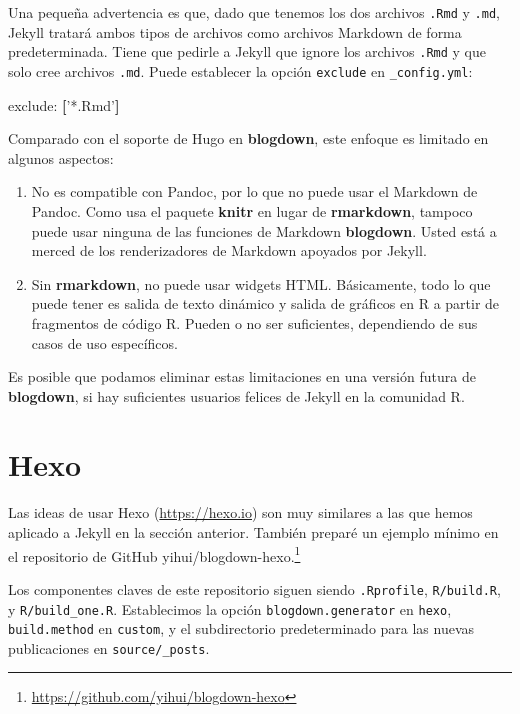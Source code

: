 \documentclass[12pt,]{krantz}
\makeatletter
\newenvironment{Shaded}{\begin{snugshade}}{\end{snugshade}}
\newcommand{\AttributeTok}[1]{\textcolor[rgb]{0.77,0.63,0.00}{#1}}
\newcommand{\FunctionTok}[1]{\textcolor[rgb]{0.00,0.00,0.00}{#1}}
\newcommand{\KeywordTok}[1]{\textcolor[rgb]{0.13,0.29,0.53}{\textbf{#1}}}
\newcommand{\StringTok}[1]{\textcolor[rgb]{0.31,0.60,0.02}{#1}}
\renewcommand{\href}[2]{#2\footnote{\url{#1}}}
\newenvironment{kframe}{%
\medskip{}
\setlength{\fboxsep}{.8em}
 \def\at@end@of@kframe{}%
 \ifinner\ifhmode%
  \def\at@end@of@kframe{\end{minipage}}%
  \begin{minipage}{\columnwidth}%
 \fi\fi%
 \def\FrameCommand##1{\hskip\@totalleftmargin \hskip-\fboxsep
 \colorbox{shadecolor}{##1}\hskip-\fboxsep
     \hskip-\linewidth \hskip-\@totalleftmargin \hskip\columnwidth}%
 \MakeFramed {\advance\hsize-\width
   \@totalleftmargin\z@ \linewidth\hsize
   \@setminipage}}%
 {\par\unskip\endMakeFramed%
 \at@end@of@kframe}
\renewenvironment{Shaded}{\begin{kframe}}{\end{kframe}}
\theoremstyle{definition}
\theoremstyle{definition}
\theoremstyle{definition}
\theoremstyle{remark}
\makeatother
\begin{document}
Una pequeña advertencia es que, dado que tenemos los dos archivos
\texttt{.Rmd} y \texttt{.md}, Jekyll tratará ambos tipos de archivos
como archivos Markdown de forma predeterminada. Tiene que pedirle a
Jekyll que ignore los archivos \texttt{.Rmd} y que solo cree archivos
\texttt{.md}. Puede establecer la opción \texttt{exclude} en
\texttt{\_config.yml}:

\begin{Shaded}
\begin{Highlighting}[]
\FunctionTok{exclude:}\AttributeTok{ }\KeywordTok{[}\StringTok{'*.Rmd'}\KeywordTok{]}
\end{Highlighting}
\end{Shaded}

Comparado con el soporte de Hugo en \textbf{blogdown}, este enfoque es
limitado en algunos aspectos:

\begin{enumerate}
\def\labelenumi{\arabic{enumi}.}
\item
  No es compatible con Pandoc, por lo que no puede usar el Markdown de
  Pandoc. Como usa el paquete \textbf{knitr} en lugar de
  \textbf{rmarkdown}, tampoco puede usar ninguna de las funciones de
  Markdown \textbf{blogdown}. Usted está a merced de los renderizadores
  de Markdown apoyados por Jekyll.
\item
  Sin \textbf{rmarkdown}, no puede usar widgets HTML. Básicamente, todo
  lo que puede tener es salida de texto dinámico y salida de gráficos en
  R a partir de fragmentos de código R. Pueden o no ser suficientes,
  dependiendo de sus casos de uso específicos.
\end{enumerate}

Es posible que podamos eliminar estas limitaciones en una versión futura
de \textbf{blogdown}, si hay suficientes usuarios felices de Jekyll en
la comunidad R.

\hypertarget{hexo}{%
\section{Hexo}\label{hexo}}

Las ideas de usar Hexo (\url{https://hexo.io}) son muy
similares a las que hemos aplicado a Jekyll en la sección anterior.
También preparé un ejemplo mínimo en el repositorio de GitHub
\href{https://github.com/yihui/blogdown-hexo}{yihui/blogdown-hexo.}

Los componentes claves de este repositorio siguen siendo
\texttt{.Rprofile}, \texttt{R/build.R}, y \texttt{R/build\_one.R}.
Establecimos la opción \texttt{blogdown.generator} en \texttt{hexo},
\texttt{build.method} en \texttt{custom}, y el subdirectorio
predeterminado para las nuevas publicaciones en \texttt{source/\_posts}.
\end{document}
